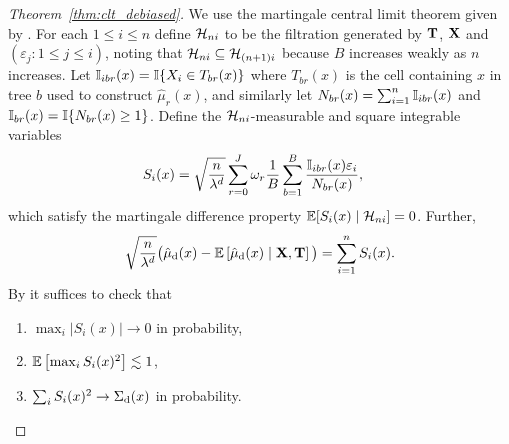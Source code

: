 \begin{proof}[Theorem~\ref{thm:clt_debiased}]

  We use the martingale central limit theorem given by
  \citet[Theorem~3.2]{hall2014martingale}.
  For each $1 \leq i \leq n$ define
  $\mathcal{H}_{n i}$ to be the filtration
  generated by $\mathbf{T}$, $\mathbf{X}$ and
  $(\varepsilon_j : 1 \leq j \leq i)$,
  noting that $\mathcal{H}_{n i} \subseteq \mathcal{H}_{(n+1)i}$
  because $B$ increases weakly as $n$ increases.
  Let $\mathbb{I}_{i b r}(x) = \mathbb{I}\{X_i \in T_{b r}(x)\}$
  where $T_{b r}(x)$ is the cell containing $x$ in tree $b$
  used to construct $\hat \mu_r(x)$,
  and similarly let $N_{b r}(x) = \sum_{i=1}^n \mathbb{I}_{i b r}(x)$
  and $\mathbb{I}_{b r}(x) = \mathbb{I}\{N_{b r}(x) \geq 1\}$.
  Define the $\mathcal{H}_{n i}$-measurable and square integrable
  variables
  \begin{align*}
    S_i(x)
    &=
    \sqrt{\frac{n}{\lambda^d}}
    \sum_{r=0}^{J}
    \omega_r
    \frac{1}{B} \sum_{b=1}^B
    \frac{\mathbb{I}_{i b r}(x) \varepsilon_i} {N_{b r}(x)},
  \end{align*}
  which satisfy the martingale
  difference property
  $\mathbb{E} [ S_i(x) \mid \mathcal{H}_{n i} ] = 0$.
  Further,
  \begin{align*}
    \sqrt{\frac{n}{\lambda^d}}
    \big(
      \hat\mu_{\mathrm{d}}(x)
      - \mathbb{E}\left[
        \hat\mu_{\mathrm{d}}(x) \mid \mathbf{X}, \mathbf{T}
      \right]
    \big)
    = \sum_{i=1}^n S_i(x).
  \end{align*}
  By \citet[Theorem~3.2]{hall2014martingale}
  it suffices to check that
  \begin{enumerate}[label=(\roman*)]
    \item $\max_i |S_i(x)| \to 0$ in probability,
      \label{it:hall_prob}
    \item $\mathbb{E}\left[\max_i S_i(x)^2\right] \lesssim 1$,
      \label{it:hall_exp}
    \item $\sum_i S_i(x)^2 \to \Sigma_{\mathrm{d}}(x)$ in probability.
      \label{it:hall_var}
  \end{enumerate}


\end{proof}
